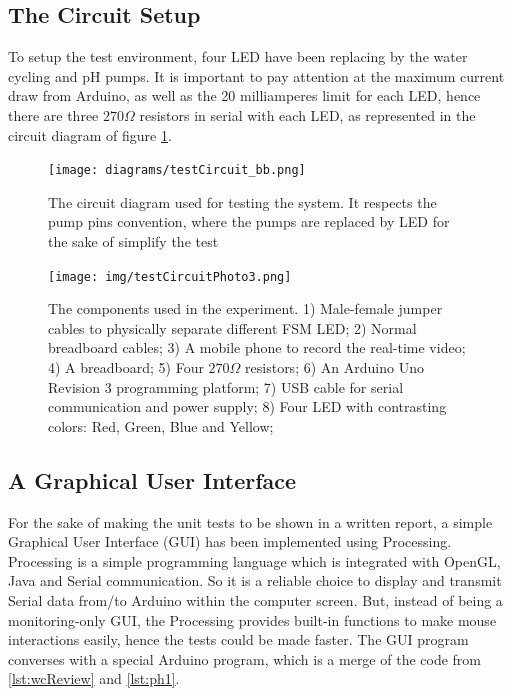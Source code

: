 
\subsection{The Circuit Setup}

To setup the test environment,
four LED have been replacing by the water cycling and pH pumps.
It is important to pay attention at the maximum current draw from Arduino,
as well as the 20 milliamperes limit for each LED,
hence there are three $270\Omega$ resistors in serial with each LED,
as represented in the circuit diagram of figure \ref{fig:testCircuit}.

\begin{figure}[h!]
    \centering
    \texttt{[image: diagrams/testCircuit\_bb.png]}
    \caption{The circuit diagram used for testing the system. It respects the pump pins convention, where the pumps are replaced by LED for the sake of simplify the test}
    \label{fig:testCircuit}
\end{figure}

\begin{figure}[h!]
    \centering
    \texttt{[image: img/testCircuitPhoto3.png]}
    \caption{The components used in the experiment.
    1) Male-female jumper cables to physically separate different FSM LED;
    2) Normal breadboard cables;
    3) A mobile phone to record the real-time video;
    4) A breadboard;
    5) Four $270\Omega$ resistors;
    6) An Arduino Uno Revision 3 programming platform;
    7) USB cable for serial communication and power supply;
    8) Four LED with contrasting colors: Red, Green, Blue and Yellow;
}
    \label{fig:photoCircuit}
\end{figure}

\subsection{A Graphical User Interface}

For the sake of making the unit tests to be shown in a written report,
a simple Graphical User Interface (GUI) has been implemented using Processing.
Processing is a simple programming language which is integrated with OpenGL,
Java and Serial communication.
So it is a reliable choice to display and transmit Serial data from/to Arduino within the computer screen.
But,
instead of being a monitoring-only GUI,
the Processing provides built-in functions to make mouse interactions easily,
hence the tests could be made faster.
The GUI program converses with a special Arduino program,
which is a merge of the code from \ref{lst:wcReview} and \ref{lst:ph1}.

